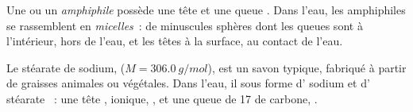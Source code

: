 \begin{definition}\label{def:g11:dissolution:amphiphilic}
Une  ou un  \emph{amphiphile} possède une
tête  et une queue . Dans l'eau, les 
amphiphiles se rassemblent en \emph{micelles}~: de
minuscules sphères dont les queues sont à l'intérieur, hors de l'eau, et
les têtes à la surface, au contact de l'eau.
\end{definition}

\begin{example}[Un savon]\label{ex:g11:dissolution:soap}
Le stéarate de sodium,  ($M = \qty{306.0}{g/mol}$), est
un savon typique, fabriqué à partir de graisses animales ou végétales.
Dans l'eau, il  sous forme d' sodium  et d'
stéarate ~: une tête , ionique, , et
une queue de 17  de carbone, .
\end{example}

